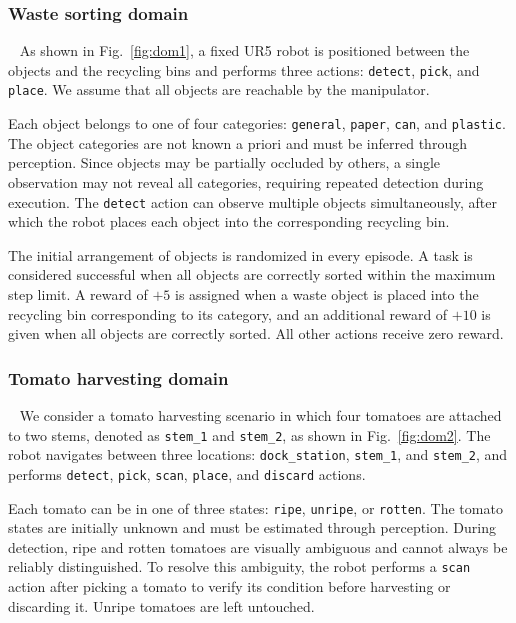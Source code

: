 \subsubsection{Waste sorting domain}~\label{exp:setup_waste}
As shown in Fig.~\ref{fig:dom1}, a fixed UR5 robot is positioned between the objects and the recycling bins and performs three actions: \texttt{detect}, \texttt{pick}, and \texttt{place}. We assume that all objects are reachable by the manipulator.

Each object belongs to one of four categories: \texttt{general}, \texttt{paper}, \texttt{can}, and \texttt{plastic}. The object categories are not known a priori and must be inferred through perception. Since objects may be partially occluded by others, a single observation may not reveal all categories, requiring repeated detection during execution. The \texttt{detect} action can observe multiple objects simultaneously, after which the robot places each object into the corresponding recycling bin.

The initial arrangement of objects is randomized in every episode. A task is considered successful when all objects are correctly sorted within the maximum step limit. A reward of $+5$ is assigned when a waste object is placed into the recycling bin corresponding to its category, and an additional reward of $+10$ is given when all objects are correctly sorted. All other actions receive zero reward.



\subsubsection{Tomato harvesting domain}~\label{exp:setup_tomato}
We consider a tomato harvesting scenario in which four tomatoes are attached to two stems, denoted as \texttt{stem\_1} and \texttt{stem\_2}, as shown in Fig.~\ref{fig:dom2}. The robot navigates between three locations: \texttt{dock\_station}, \texttt{stem\_1}, and \texttt{stem\_2}, and performs \texttt{detect}, \texttt{pick}, \texttt{scan}, \texttt{place}, and \texttt{discard} actions.

Each tomato can be in one of three states: \texttt{ripe}, \texttt{unripe}, or \texttt{rotten}. The tomato states are initially unknown and must be estimated through perception. During detection, ripe and rotten tomatoes are visually ambiguous and cannot always be reliably distinguished. To resolve this ambiguity, the robot performs a \texttt{scan} action after picking a tomato to verify its condition before harvesting or discarding it. Unripe tomatoes are left untouched.

